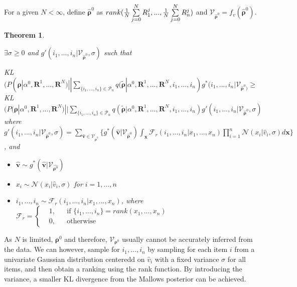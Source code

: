 \documentclass[11pt, oneside]{article}   	%
\newtheorem{theorem}{Theorem}[subsection]
\begin{document}
\subsection{ }
For a given $N < \infty$, define $\hat{\bm{\rho}}^0$ as $rank({1\over N}\sum\limits_{j=0}^{N}R_1^j, ..., {1\over N}\sum\limits_{j=0}^{N}R_n^j)$ and  $\mathcal{V}_{\hat{\bm{\rho}}^0} = f_v(\hat{\bm{\rho}}^0)$. 

\begin{theorem} \label{theorem:gaussiannoise}

$\exists\sigma \geq 0$ and $g'(i_1, ..., i_n|\mathcal{V}_{\hat{\bm{\rho}}^0}, \sigma)$ such that 

 KL $(P(\bm{\rho}|\alpha^0, \bm{R}^1, ...,\bm{R}^N ) || \sum\limits_{\{i_1,..., i_n\} \in \mathcal{P}_n} q (\tilde{\bm{\rho}}|\alpha^0, \bm{R}^1,..., \bm{R}^N, i_1,...,i_n) g^{*}(i_1,...,i_n|\mathcal{V}_{\hat{\bm{\rho}}^0)}\geq $\\
 KL $(P(\bm{\rho}|\alpha^0, \bm{R}^1, ...,\bm{R}^N ) || \sum\limits_{\{i_1,..., i_n\} \in \mathcal{P}_n} q (\tilde{\bm{\rho}}|\alpha^0, \bm{R}^1,..., \bm{R}^N, i_1,...,i_n) g'(i_1,...,i_n|\mathcal{V}_{\hat{\bm{\rho}}^0}, \sigma)$\\

 where 
 $g'(i_1, ..., i_n|\mathcal{V}_{\hat{\bm{\rho}}^0}, \sigma) = \sum\limits_{\hat{\bm{v}}\in \mathcal{V}_{\hat{\bm{\rho}}^0}}\{ g^* (\hat{\bm{v}}|\mathcal{V}_{\hat{\bm{\rho}}^{0}}) \int_{\bm{x}}\mathcal{F}_r(i_1,..., i_n|x_1, ...,x_n)\prod\limits_{i=1}^{n}\mathcal{N}(x_i|\hat{v}_i, \sigma)d\bm{x}\}$,
 and
 
 \begin{itemize}
 	\item {$\hat{\bm{v}} \sim g^* (\hat{\bm{v}}|\mathcal{V}_{\hat{\bm{\rho}^{0}}})$}
  	\item {$x_i\sim \mathcal{N}(x_i|\hat{v}_i, \sigma)$} for $i = 1,...,n $
 	\item {$i_1, ..., i_n \sim \mathcal{F}_r(i_1, ..., i_n|x_1, ..., x_n)$}, where $
 	\mathcal{F}_r = \left \{
 	\begin{aligned}
 	&1, && \text{if } \{i_1, ..., i_n\} = rank(x_1, ..., x_n) \\
 	&0, && \text{otherwise}
 	\end{aligned} \right.
 	$
 
 \end{itemize}
 	
\end{theorem} 
As $N$ is limited, $\bm{\rho}^0$ and therefore, $\mathcal{V}_{\bm{\rho}^0}$ usually cannot be accurately inferred from the data. We can however, sample for $i_1, ..., i_n$ by sampling for each item $i$ from a univariate Gaussian distribution centeredd on $\hat{v}_i$ with a fixed variance $\sigma$ for all items, and then obtain a ranking using the rank function. By introducing the variance, a smaller KL divergence from the Mallows posterior can be achieved.
 
\end{document}
